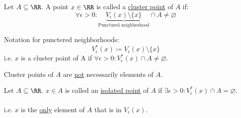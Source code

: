 \documentclass[class=scrartcl, crop=false]{standalone}
\begin{document}
\begin{definition}
  Let $A \subseteq \RR$. A point $x \in \RR$ is called a \ul{cluster point} of $A$ if:
  \[
    \forall \epsilon > 0 : \underbrace{V_\epsilon(x) \setminus \{x\}}_{\text{Punctured neighborhood}} \cap A \neq \varnothing
  \]
\end{definition} 

\begin{note}
  Notation for punctered neighborhoods:
  \[
    V_\epsilon^*(x) \coloneqq V_\epsilon(x) \setminus \{x\}
  \]
  i.e. $x$ is a cluster point of A if $\forall \epsilon > 0 : V_\epsilon^*(x) \cap A \neq \varnothing$.
  \begin{remark}
    Cluster points of $A$ are \ul{not} necessarily elements of $A$.
  \end{remark} 
\end{note} 

\begin{definition}
  Let $A \subseteq \RR$. $x \in A$ is called an \ul{isolated point} of $A$ if $\exists \epsilon > 0 : V_\epsilon^*(x) \cap A = \varnothing$.
  \\\\
  i.e. $x$ is the \ul{only} element of $A$ that is in  $V_\epsilon(x)$.
\end{definition} 
\end{document}
